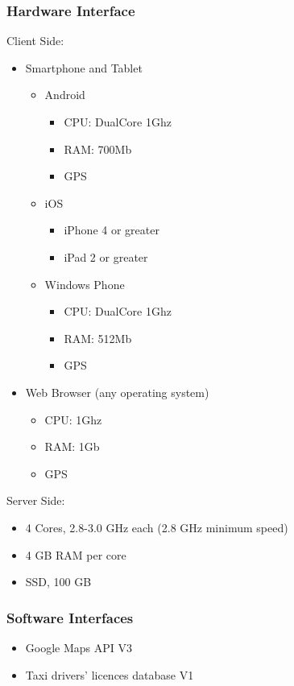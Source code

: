 \documentclass[a4paper]{article}
\begin{document}
\subsubsection{Hardware Interface}
Client Side:
\begin{itemize}
\item Smartphone and Tablet
    \begin{itemize}
    \item Android
        \begin{itemize}
        \item CPU: DualCore 1Ghz
        \item RAM: 700Mb
        \item GPS
        \end{itemize}
    \item iOS
        \begin{itemize}
        \item iPhone 4 or greater
        \item iPad 2 or greater
        \end{itemize}
    \item Windows Phone
        \begin{itemize}
        \item CPU: DualCore 1Ghz
        \item RAM: 512Mb
        \item GPS
        \end{itemize}
    \end{itemize}
\item Web Browser (any operating system)
    \begin{itemize}
    \item CPU: 1Ghz
    \item RAM: 1Gb
    \item GPS
    \end{itemize}
\end{itemize}

Server Side:
\begin{itemize}
\item 4 Cores, 2.8-3.0 GHz each (2.8 GHz minimum speed)
\item 4 GB RAM per core
\item SSD, 100 GB
\end{itemize}

\subsubsection{Software Interfaces}
\begin{itemize}
\item Google Maps API V3
\item Taxi drivers' licences database V1
\end{itemize}
\end{document}
